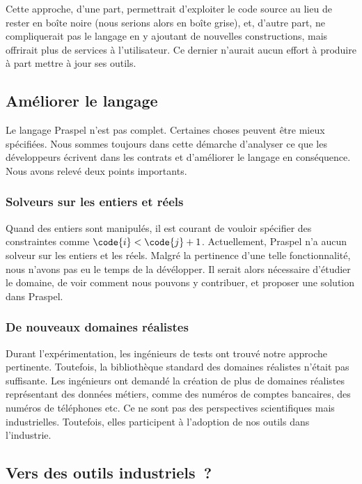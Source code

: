 Cette approche, d'une part, permettrait d'exploiter le code source au lieu de
rester en boîte noire (nous serions alors en boîte grise), et, d'autre part, ne
compliquerait pas le langage en y ajoutant de nouvelles constructions, mais
offrirait plus de services à l'utilisateur. Ce dernier n'aurait aucun effort à
produire à part mettre à jour ses outils.

\subsection{Améliorer le langage}

Le langage Praspel n'est pas complet. Certaines choses peuvent être mieux
spécifiées. Nous sommes toujours dans cette démarche d'analyser ce que les
développeurs écrivent dans les contrats et d'améliorer le langage en
conséquence. Nous avons relevé deux points importants.

\subsubsection{Solveurs sur les entiers et réels}

Quand des entiers sont manipulés, il est courant de vouloir spécifier des
constraintes comme $\code{i} < \code{j} + 1$. Actuellement, Praspel n'a aucun
solveur sur les entiers et les réels. Malgré la pertinence d'une telle
fonctionnalité, nous n'avons pas eu le temps de la dévélopper. Il serait alors
nécessaire d'étudier le domaine, de voir comment nous pouvons y contribuer, et
proposer une solution dans Praspel.

\subsubsection{De nouveaux domaines réalistes}

Durant l'expérimentation, les ingénieurs de tests ont trouvé notre approche
pertinente. Toutefois, la bibliothèque standard des domaines réalistes n'était
pas suffisante. Les ingénieurs ont demandé la création de plus de domaines
réalistes représentant des données métiers, comme des numéros de comptes
bancaires, des numéros de téléphones etc. Ce ne sont pas des perspectives
scientifiques mais industrielles. Toutefois, elles participent à l'adoption de
nos outils dans l'industrie.

\subsection{Vers des outils industriels~?}

